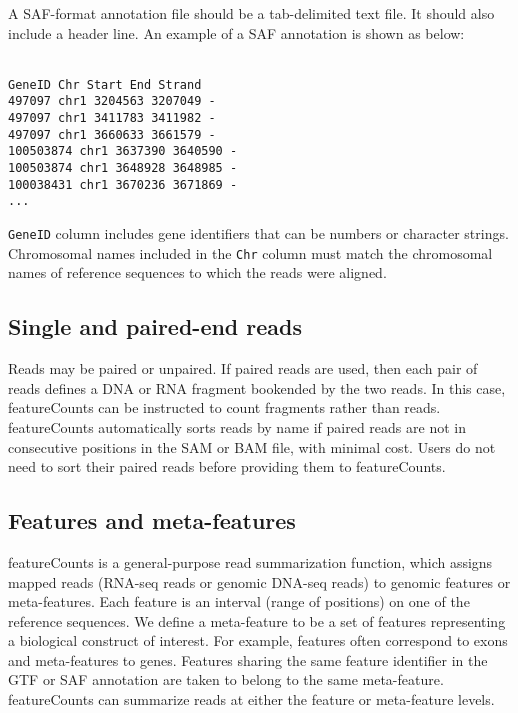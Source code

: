\documentclass[12pt]{report}
\newcommand{\code}[1]{{\small\texttt{#1}}}
\newcommand{\featureCounts}{\textsf{featureCounts}}
\begin{document}
A SAF-format annotation file should be a tab-delimited text file.
It should also include a header line.
An example of a SAF annotation is shown as below:

\code{\\
GeneID	Chr	Start	End	Strand\\
497097	chr1	3204563	3207049	-\\
497097	chr1	3411783	3411982	-\\
497097	chr1	3660633	3661579	-\\
100503874	chr1	3637390	3640590	-\\
100503874	chr1	3648928	3648985	-\\
100038431	chr1	3670236	3671869	-\\
...
}

\code{GeneID} column includes gene identifiers that can be numbers or character strings.
Chromosomal names included in the \code{Chr} column must match the chromosomal names of reference sequences to which the reads were aligned.

\subsection{Single and paired-end reads}

Reads may be paired or unpaired.
If paired reads are used, then each pair of reads defines a DNA or RNA fragment bookended by the two reads.
In this case, {\featureCounts} can be instructed to count fragments rather than reads.
{\featureCounts} automatically sorts reads by name if paired reads are not in consecutive positions in the SAM or BAM file, with minimal cost.
Users do not need to sort their paired reads before providing them to {\featureCounts}.

\subsection{Features and meta-features}

{\featureCounts} is a general-purpose read summarization function, which assigns mapped reads (RNA-seq reads or genomic DNA-seq reads) to genomic features or meta-features.
Each feature is an interval (range of positions) on one of the reference sequences. We define a meta-feature to be a set of features representing a biological construct of interest. For example, features often correspond to exons and meta-features to genes. Features sharing the same feature identifier in the GTF or SAF annotation are taken to belong to the same meta-feature. {\featureCounts} can summarize reads at either the feature or meta-feature levels.
\end{document}
